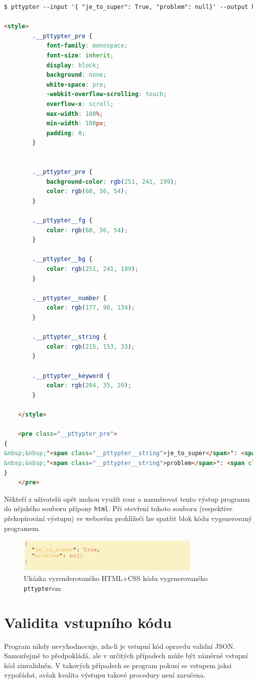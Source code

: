 \documentclass[11pt, letterpaper]{article}
\begin{document}
\begin{lstlisting}[language=HTML]
$ pttypter --input '{ "je_to_super": True, "problem": null}' --output html --theme light

<style>
		.__pttypter_pre {
			font-family: monospace;
			font-size: inherit;
			display: block;
			background: none;
			white-space: pre;
			-webkit-overflow-scrolling: touch;
			overflow-x: scroll;
			max-width: 100%;
			min-width: 100px;
			padding: 0;
		}

		
		.__pttypter_pre {
			background-color: rgb(251, 241, 199);
			color: rgb(60, 56, 54);
		}

		.__pttypter__fg {
			color: rgb(60, 56, 54);
		}

		.__pttypter__bg {
			color: rgb(251, 241, 199);
		}

		.__pttypter__number {
			color: rgb(177, 98, 134);
		}

		.__pttypter__string {
			color: rgb(215, 153, 33);
		}

		.__pttypter__keyword {
			color: rgb(204, 35, 29);
		}
	
	</style>

	<pre class="__pttypter_pre">
{
&nbsp;&nbsp;"<span class="__pttypter__string">je_to_super</span>": <span class="__pttypter__keyword">True</span>,
&nbsp;&nbsp;"<span class="__pttypter__string">problem</span>": <span class="__pttypter__keyword">null</span>
}
	</pre>

\end{lstlisting}

Někteří z uživatelů opět mohou využít rour a nasměrovat tento výstup programu do nějakého souboru přípony \texttt{html}. Při otevření tohoto souboru (respektive překopírování výstupu) ve webovém prohlížeči lze spatřit blok kódu vygenerovaný programem.

\begin{figure}[H]
    \begin{center}
        \includegraphics[width=0.8\textwidth]{web1}
    \end{center}
    \caption{Ukázka vyrenderovaného HTML+CSS kódu vygenerovaného \texttt{pttypter}em}
\end{figure}

\section{Validita vstupního kódu}
Program nikdy nevyhodnocuje, zda-li je vstupní kód opravdu validní JSON. Samozřejmě to předpokládá, ale v určitých případech může být záměrně vstupní kód zinvalidněn. V takových případech se program pokusí se vstupem jaksi vypořádat, avšak kvalita výstupu takové procedury není zaručena.
\end{document}
